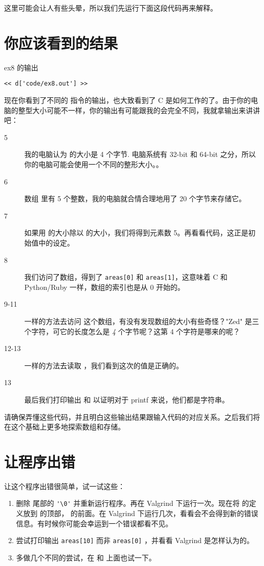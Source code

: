 这里可能会让人有些头晕，所以我们先运行下面这段代码再来解释。

\section{你应该看到的结果}

\begin{code}{ex8 的输出}
\begin{lstlisting}
<< d['code/ex8.out'] >>
\end{lstlisting}
\end{code}

现在你看到了不同的  指令的输出，也大致看到了 C 是如何工作的了。由于你的电脑的整型大小可能不一样，你的输出有可能跟我的会完全不同，我就拿输出来讲讲吧：

\begin{description}
\item [5] 我的电脑认为  的大小是 4 个字节. 电脑系统有 32-bit 和 64-bit 之分，所以你的电脑可能会使用一个不同的整形大小。。
\item [6] 数组  里有 5 个整数，我的电脑就合情合理地用了 20 个字节来存储它。
\item [7] 如果用  的大小除以  的大小，我们将得到元素数 5。再看看代码，这正是初始值中的设定。
\item [8] 我们访问了数组，得到了 \verb|areas[0]| 和 \verb|areas[1]|，这意味着 C 和 Python/Ruby 一样，数组的索引也是从 0 开始的。
\item [9-11] 一样的方法去访问  这个数组，有没有发现数组的大小有些奇怪？"Zed" 是三个字符，可它的长度怎么是 \emph{4} 个字节呢？这第 4 个字符是哪来的呢？
\item [12-13] 一样的方法去读取 ，我们看到这次的值是正确的。 
\item [13] 最后我们打印输出  和  以证明对于 printf 来说，他们都是字符串。
\end{description}

请确保弄懂这些代码，并且明白这些输出结果跟输入代码的对应关系。之后我们将在这个基础上更多地探索数组和存储。

\section{让程序出错}

让这个程序出错很简单，试一试这些：

\begin{enumerate}
\item 删除  尾部的 \verb|'\0'| 并重新运行程序。再在 Valgrind 下运行一次。现在将  的定义放到  的顶部， 的前面。在 Valgrind 下运行几次，看看会不会得到新的错误信息。有时候你可能会幸运到一个错误都看不见。
\item 尝试打印输出 \verb|areas[10]| 而非 \verb|areas[0]| ，并看看 Valgrind 是怎样认为的。
\item 多做几个不同的尝试，在  和  上面也试一下。
\end{enumerate}

